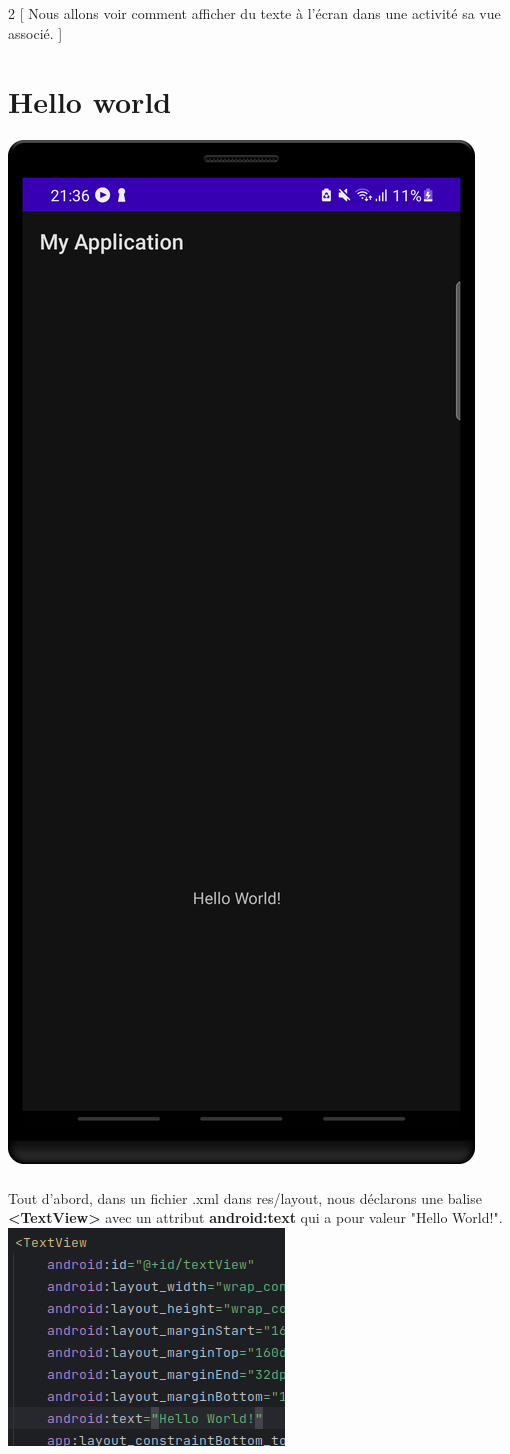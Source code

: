 \documentclass[a4paper]{article}
\begin{document}
\begin{multicols}{2}
  [
    Nous allons voir comment afficher du texte à l'écran dans une activité sa vue associé.
  ]
  \section{Hello world}
  \noindent\includegraphics[width=.49\textwidth]{captureHelloWorldAppPhone}
  \paragraph{}
  Tout d'abord, dans un fichier .xml dans res/layout, nous déclarons une balise \textbf{<TextView>} avec un attribut \textbf{android:text} qui a pour valeur "Hello World!".
  \newline\newline
  \includegraphics[width=.49\textwidth]{screenshotHelloWorldLayout}
  \newline
  

\end{multicols}
\end{document}
